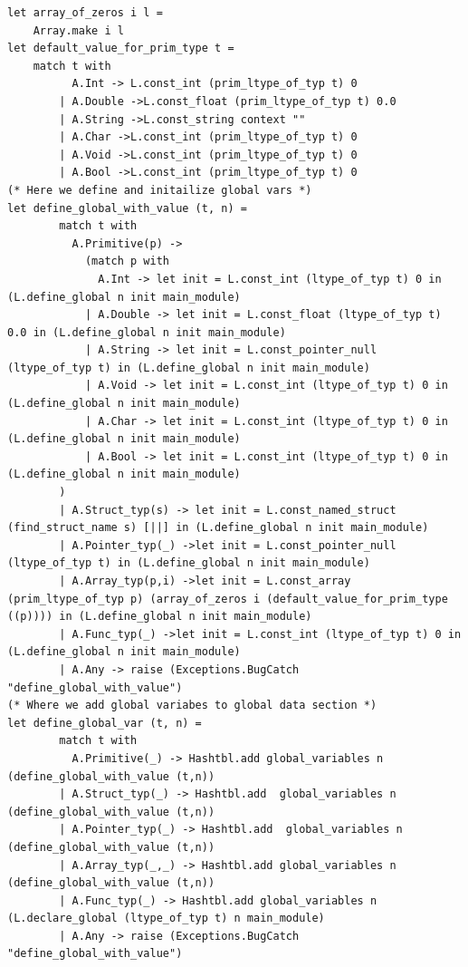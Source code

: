 \documentclass{article}
\begin{document}
\begin{lstlisting}
let array_of_zeros i l = 
	Array.make i l
let default_value_for_prim_type t = 
	match t with 
		  A.Int -> L.const_int (prim_ltype_of_typ t) 0
		| A.Double ->L.const_float (prim_ltype_of_typ t) 0.0
		| A.String ->L.const_string context "" 
		| A.Char ->L.const_int (prim_ltype_of_typ t) 0
		| A.Void ->L.const_int (prim_ltype_of_typ t) 0
		| A.Bool ->L.const_int (prim_ltype_of_typ t) 0
(* Here we define and initailize global vars *)
let define_global_with_value (t, n) = 
		match t with 
		  A.Primitive(p) -> 
			(match p with
			  A.Int -> let init = L.const_int (ltype_of_typ t) 0 in (L.define_global n init main_module)
			| A.Double -> let init = L.const_float (ltype_of_typ t) 0.0 in (L.define_global n init main_module)
			| A.String -> let init = L.const_pointer_null (ltype_of_typ t) in (L.define_global n init main_module)		
			| A.Void -> let init = L.const_int (ltype_of_typ t) 0 in (L.define_global n init main_module)
			| A.Char -> let init = L.const_int (ltype_of_typ t) 0 in (L.define_global n init main_module)
			| A.Bool -> let init = L.const_int (ltype_of_typ t) 0 in (L.define_global n init main_module)
		)
		| A.Struct_typ(s) -> let init = L.const_named_struct (find_struct_name s) [||] in (L.define_global n init main_module)		
		| A.Pointer_typ(_) ->let init = L.const_pointer_null (ltype_of_typ t) in (L.define_global n init main_module)		
		| A.Array_typ(p,i) ->let init = L.const_array (prim_ltype_of_typ p) (array_of_zeros i (default_value_for_prim_type ((p)))) in (L.define_global n init main_module)		
		| A.Func_typ(_) ->let init = L.const_int (ltype_of_typ t) 0 in (L.define_global n init main_module)		
		| A.Any -> raise (Exceptions.BugCatch "define_global_with_value")
(* Where we add global variabes to global data section *)
let define_global_var (t, n) =
		match t with
		  A.Primitive(_) -> Hashtbl.add global_variables n (define_global_with_value (t,n))
		| A.Struct_typ(_) -> Hashtbl.add  global_variables n (define_global_with_value (t,n))
		| A.Pointer_typ(_) -> Hashtbl.add  global_variables n (define_global_with_value (t,n))
		| A.Array_typ(_,_) -> Hashtbl.add global_variables n (define_global_with_value (t,n))
		| A.Func_typ(_) -> Hashtbl.add global_variables n (L.declare_global (ltype_of_typ t) n main_module)
		| A.Any -> raise (Exceptions.BugCatch "define_global_with_value")
	

\end{lstlisting}
\end{document}
